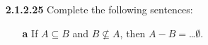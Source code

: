 \documentclass[10pt, a4paper]{article}
\begin{document}
\begin{itemize}
  \item[\textbf{2.1.2.25}] Complete the following sentences:
    \begin{itemize}
      \item[\textbf{a}] If $A \subseteq B$ and $B \not \subseteq A$, then $A-B = $\dots$\emptyset$.
    \end{itemize}
\end{itemize}
\end{document}
